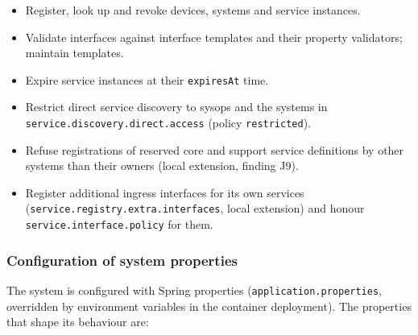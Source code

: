 \documentclass[a4paper]{arrowhead}
\begin{document}
\begin{itemize}
  \item Register, look up and revoke devices, systems and service instances.
  \item Validate interfaces against interface templates and their property validators; maintain templates.
  \item Expire service instances at their \texttt{expiresAt} time.
  \item Restrict direct service discovery to sysops and the systems in \texttt{service.\allowbreak{}discovery.\allowbreak{}direct.\allowbreak{}access} (policy \texttt{restricted}).
  \item Refuse registrations of reserved core and support service definitions by other systems than their owners (local extension, finding J9).
  \item Register additional ingress interfaces for its own services (\texttt{service.\allowbreak{}registry.\allowbreak{}extra.\allowbreak{}interfaces}, local extension) and honour \texttt{service.\allowbreak{}interface.\allowbreak{}policy} for them.
\end{itemize}

\subsubsection{Configuration of system properties}

The system is configured with Spring properties (\texttt{application.properties}, overridden by environment variables in the container deployment). The properties that shape its behaviour are:
\end{document}
